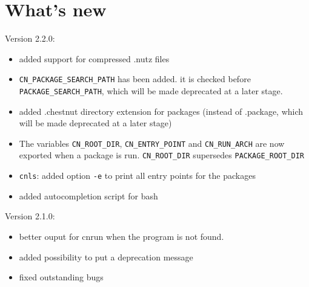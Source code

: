 \section{What's new}

Version 2.2.0:
\begin{itemize}
\item added support for compressed .nutz files
\item \verb+CN_PACKAGE_SEARCH_PATH+ has been added. it is checked before \verb+PACKAGE_SEARCH_PATH+, which will be made deprecated at a later stage.
\item added .chestnut directory extension for packages (instead of .package, which will be made deprecated at a later stage)
\item The variables \verb+CN_ROOT_DIR+, \verb+CN_ENTRY_POINT+ and \verb+CN_RUN_ARCH+ are now exported when a package is run. \verb+CN_ROOT_DIR+ supersedes \verb+PACKAGE_ROOT_DIR+
\item \verb+cnls+: added option \verb+-e+ to print all entry points for the packages
\item added autocompletion script for bash
\end{itemize}
Version 2.1.0:
\begin{itemize}
\item better ouput for cnrun when the program is not found.
\item added possibility to put a deprecation message
\item fixed outstanding bugs
\end{itemize}
